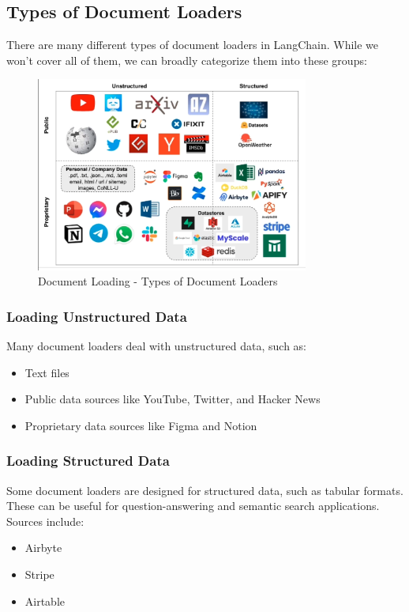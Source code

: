 \documentclass{article}
\begin{document}
\subsection{Types of Document Loaders}
There are many different types of document loaders in LangChain. While we won’t cover all of them, we can broadly categorize them into these groups:

\begin{figure}[H]
    \centering
    \includegraphics[width=0.8\textwidth]{images/langchain_chat_with_your_data_003.png}
    \caption{Document Loading - Types of Document Loaders}
    \label{fig:document_loading_types_of_document_loaders}
\end{figure}

\subsubsection{Loading Unstructured Data}
Many document loaders deal with unstructured data, such as:
\begin{itemize}
    \item Text files
    \item Public data sources like YouTube, Twitter, and Hacker News
    \item Proprietary data sources like Figma and Notion
\end{itemize}

\subsubsection{Loading Structured Data}
Some document loaders are designed for structured data, such as tabular formats. These can be useful for question-answering and semantic search applications. Sources include:
\begin{itemize}
    \item Airbyte
    \item Stripe
    \item Airtable
\end{itemize}
\end{document}
